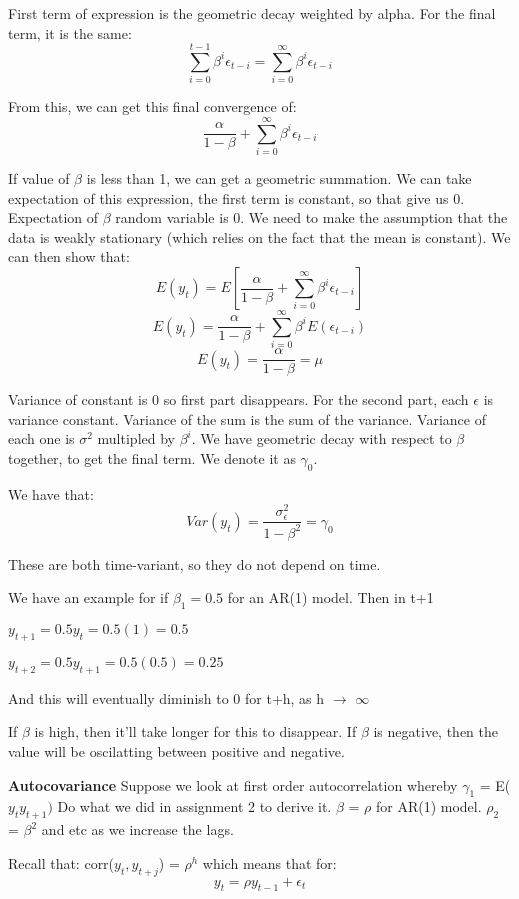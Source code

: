 \documentclass[11pt, oneside]{article}
\theoremstyle{definition}
\begin{document}
First term of expression is the geometric decay weighted by alpha. For the final term, it is the same:
$$
\sum\limits_{i=0}^{t-1}\beta^i \epsilon_{t-i} = \sum\limits_{i=0}^{\infty}\beta^i \epsilon_{t-i}
$$

From this, we can get this final convergence of:
$$
\frac{\alpha}{1-\beta} + \sum\limits_{i=0}^{\infty}\beta^i \epsilon_{t-i}
$$

If value of $\beta$ is less than 1, we can get a geometric summation. We can take expectation of this expression, the first term is constant, so that give us 0. Expectation of $\beta$ random variable is 0. We need to make the assumption that the data is weakly stationary (which relies on the fact that the mean is constant). We can then show that:
$$
E(y_t) = E[\frac{\alpha}{1-\beta} + \sum\limits_{i=0}^{\infty}\beta^i \epsilon_{t-i}]
$$
$$
E(y_t) = \frac{\alpha}{1-\beta} + \sum\limits_{i=0}^{\infty}\beta^i E(\epsilon_{t-i})
$$
$$
E(y_t) = \frac{\alpha}{1-\beta} = \mu
$$

Variance of constant is 0 so first part disappears. For the second part, each $\epsilon$ is variance constant. Variance of the sum is the sum of the variance. Variance of each one is $\sigma^2$ multipled by $\beta^i$.  We have geometric decay with respect to $\beta$ together, to get the final term. We denote it as $\gamma_0$.

We have that:
$$
Var(y_t) = \frac{\sigma_{\epsilon}^2}{1 - \beta^2} = \gamma_0
$$

These are both time-variant, so they do not depend on time.

We have an example for if $\beta_1 = 0.5$ for an AR(1) model. Then in t+1

$y_{t+1} = 0.5y_t = 0.5(1) = 0.5$

$y_{t+2} = 0.5y_{t+1}= 0.5(0.5) = 0.25$

And this will eventually diminish to 0 for t+h, as h $\rightarrow$ $\infty$

If $\beta$ is high, then it'll take longer for this to disappear. If $\beta$ is negative, then the value will be oscilatting between positive and negative.

\textbf{Autocovariance}
Suppose we look at first order autocorrelation whereby $\gamma_1$ = E($y_ty_{t+1})$ Do what we did in assignment 2 to derive it. $\beta$ = $\rho$ for AR(1) model. $\rho_2$ = $\beta^2$ and etc as we increase the lags.

Recall that: corr($y_t,y_{t+j}$) = $\rho^h$ which means that for:
$$
y_t = \rho y_{t-1} + \epsilon_t
$$
\end{document}
